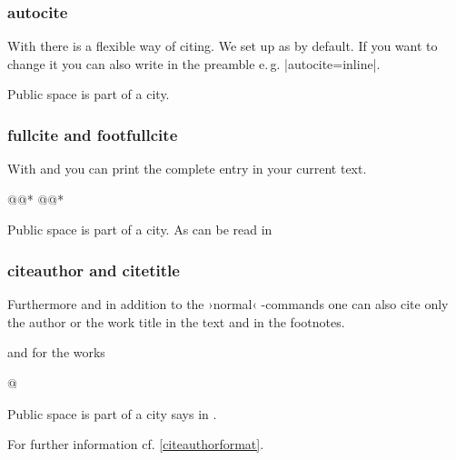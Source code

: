 \documentclass[a4paper,
10pt,
greek,
french,
spanish,
italian,
ngerman,
english,
]{ltxdoc}
\begin{document}
\subsubsection{autocite}

\DescribeMacro{\autocite}
With  there is a flexible way of citing. 
We set up  as  by default.
If you want to change it you can also write in the preamble e.\,g. |autocite=inline|.

\begin{example}
Public space is part of a city.\autocite{Osland2016} 
\end{example}

\subsubsection{fullcite and footfullcite}
\DescribeMacro{\fullcite}\DescribeMacro{\footfullcite}
With  and  you can print the complete entry in your current text.
\begin{code}
\fullcite*@@*
\footfullcite*@@*
\end{code} 

\begin{example}
Public space is part of a city.
As can be read in 
\end{example}


\subsubsection{citeauthor and citetitle}

\DescribeMacro{\citeauthor}
\DescribeMacro{\citetitle}\label{citeauthor}%
Furthermore and in addition to the ›normal‹ -commands one can also cite only the author or the work title in the text and in the footnotes.
  and for the works 
\begin{code}
\citetitle*@%
\end{code} 

\begin{example}
Public space is part of a city says \citeauthor{Osland2016} in .
\end{example}
For further information cf. \cref{citeauthorformat}.
\end{document}
